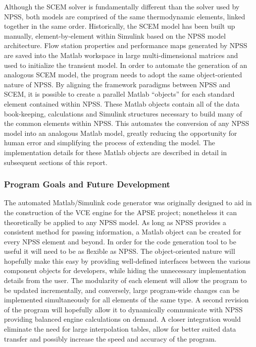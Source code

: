 \documentclass[heading.tex]{subfiles}
\begin{document}
Although the SCEM solver is fundamentally different than the solver used by NPSS, both models are comprised of 
the same thermodynamic elements, linked together in the same order. Historically, the SCEM model has been
built up manually, element-by-element within Simulink based on the NPSS model architecture. Flow station properties
and performance maps generated by NPSS are saved into the Matlab workspace in large multi-dimensional matrices
and used to initialize the transient model. In order to automate the generation of an analogous SCEM model, the
program needs to adopt the same object-oriented nature of NPSS. By aligning the framework
paradigms between NPSS and SCEM, it is possible to create a parallel Matlab “objects” for each
standard element contained within NPSS. These Matlab objects contain all of the data book-keeping,
calculations and Simulink structures necessary to build many of the common elements within NPSS.
This automates the conversion of any NPSS model into an analogous Matlab model, greatly reducing
the opportunity for human error and simplifying the process of extending the model. The implementation
details for these Matlab objects are described in detail in subsequent sections of this report.	


\subsubsection{Program Goals and Future Development}

The automated Matlab/Simulink code generator was originally designed to aid in the construction of
the VCE engine for the APSE project; nonetheless it can theoretically be applied to any NPSS
model. As long as NPSS provides a consistent method for passing information, a Matlab object can
be created for every NPSS element and beyond. In order for the code generation tool to be useful
it will need to be as flexible as NPSS. The object-oriented nature will hopefully make this easy
by providing well-defined interfaces between the various component objects for developers, while
hiding the unnecessary implementation details from the user. The modularity of each element will
allow the program to be updated incrementally, and conversely, large program-wide changes can be
implemented simultaneously for all elements of the same type. 
	A second revision of the program will hopefully allow it to dynamically communicate with NPSS
providing balanced engine calculations on demand. A closer integration would eliminate the need
for large interpolation tables, allow for better suited data transfer and possibly increase the
speed and accuracy of the program.
\end{document}
